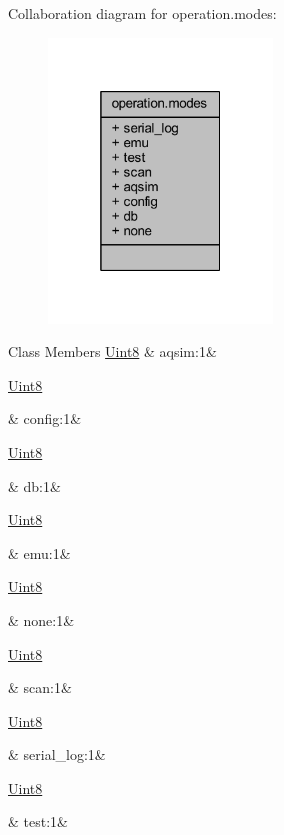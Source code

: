 Collaboration diagram for operation.\+modes\+:
\nopagebreak
\begin{figure}[H]
\begin{center}
\leavevmode
\includegraphics[width=169pt]{dd/dd7/a00260}
\end{center}
\end{figure}
\begin{DoxyFields}{Class Members}
\hypertarget{a00001_afc71f02b70f92f592414409d16d2c4d5}{\hyperlink{a00001_a979e3e23b9a449e69ab6a8a83b6042f8}{Uint8}}\label{a00001_afc71f02b70f92f592414409d16d2c4d5}
&
aqsim\+:1&
\\
\hline

\hypertarget{a00001_a2245023265ae4cf87d02c8b6ba991139}{\hyperlink{a00001_a979e3e23b9a449e69ab6a8a83b6042f8}{Uint8}}\label{a00001_a2245023265ae4cf87d02c8b6ba991139}
&
config\+:1&
\\
\hline

\hypertarget{a00001_ad77d5e503ad1439f585ac494268b351b}{\hyperlink{a00001_a979e3e23b9a449e69ab6a8a83b6042f8}{Uint8}}\label{a00001_ad77d5e503ad1439f585ac494268b351b}
&
db\+:1&
\\
\hline

\hypertarget{a00001_a65d15fe9156f9c4bbffd98085992a44e}{\hyperlink{a00001_a979e3e23b9a449e69ab6a8a83b6042f8}{Uint8}}\label{a00001_a65d15fe9156f9c4bbffd98085992a44e}
&
emu\+:1&
\\
\hline

\hypertarget{a00001_a334c4a4c42fdb79d7ebc3e73b517e6f8}{\hyperlink{a00001_a979e3e23b9a449e69ab6a8a83b6042f8}{Uint8}}\label{a00001_a334c4a4c42fdb79d7ebc3e73b517e6f8}
&
none\+:1&
\\
\hline

\hypertarget{a00001_a53aefec08170b2ebed981a0a86d0dbe0}{\hyperlink{a00001_a979e3e23b9a449e69ab6a8a83b6042f8}{Uint8}}\label{a00001_a53aefec08170b2ebed981a0a86d0dbe0}
&
scan\+:1&
\\
\hline

\hypertarget{a00001_afb0e9cfed573af3386c32c1abbcba5e1}{\hyperlink{a00001_a979e3e23b9a449e69ab6a8a83b6042f8}{Uint8}}\label{a00001_afb0e9cfed573af3386c32c1abbcba5e1}
&
serial\+\_\+log\+:1&
\\
\hline

\hypertarget{a00001_a098f6bcd4621d373cade4e832627b4f6}{\hyperlink{a00001_a979e3e23b9a449e69ab6a8a83b6042f8}{Uint8}}\label{a00001_a098f6bcd4621d373cade4e832627b4f6}
&
test\+:1&
\\
\hline

\end{DoxyFields}
